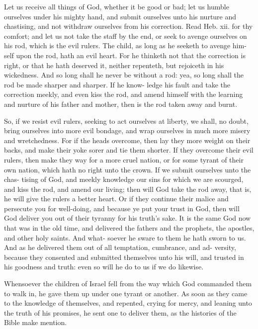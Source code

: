 \documentclass{custom}
\begin{document}
Let us receive all things of God, whether it be good or 
bad; let us humble ourselves under his mighty hand, and 
submit ourselves unto his nurture and chastising, and not 
withdraw ourselves from his correction. Read Heb. xii.
for thy comfort; and let us not take the staff by the end, 
or seek to avenge ourselves on his rod, which is the evil 
rulers. The child, as long as he seeketh to avenge him- 
self upon the rod, hath an evil heart. For he thinketh 
not that the correction is right, or that he hath deserved it, 
neither repenteth, but rejoiceth in his wickedness. And 
so long shall he never be without a rod: yea, so long 
shall the rod be made sharper and sharper. If he know- 
ledge his fault and take the correction meekly, and even 
kiss the rod, and amend himself with the learning and 
nurture of his father and mother, then is the rod taken
away and burnt. 

So, if we resist evil rulers, seeking to act ourselves at 
liberty, we shall, no doubt, bring ourselves into more 
evil bondage, and wrap ourselves in much more misery 
and wretchedness. For if the heads overcome, then 
lay they more weight on their backs, and make their 
yoke sorer and tie them shorter. If they overcome their 
evil rulers, then make they way for a more cruel nation, or 
for some tyrant of their own nation, which hath no right 
unto the crown. If we submit ourselves unto the chas- 
tising of God, and meekly knowledge our sins for which 
we are scourged, and kiss the rod, and amend our living;
then will God take the rod away, that is, he will give the 
rulers a better heart. Or if they continue their malice 
and persecute you for well-doing, and because ye put your 
trust in God, then will God deliver you out of their 
tyranny for his truth's sake. It is the same God now that 
was in the old time, and delivered the fathers and the 
prophets, the apostles, and other holy saints. And what- 
soever he sware to them he hath sworn to us. And as he 
delivered them out of all temptation, cumbrance, and ad- 
versity, because they consented and submitted themselves 
unto his will, and trusted in his goodness and truth: even 
so will he do to us if we do likewise. 

Whensoever the children of Israel fell from the way 
which God commanded them to walk in, he gave them up 
under one tyrant or another. As soon as they came to the 
knowledge of themselves, and repented, crying for mercy, 
and leaning unto the truth of his promises, he sent one to 
deliver them, as the histories of the Bible make mention.
\end{document}
